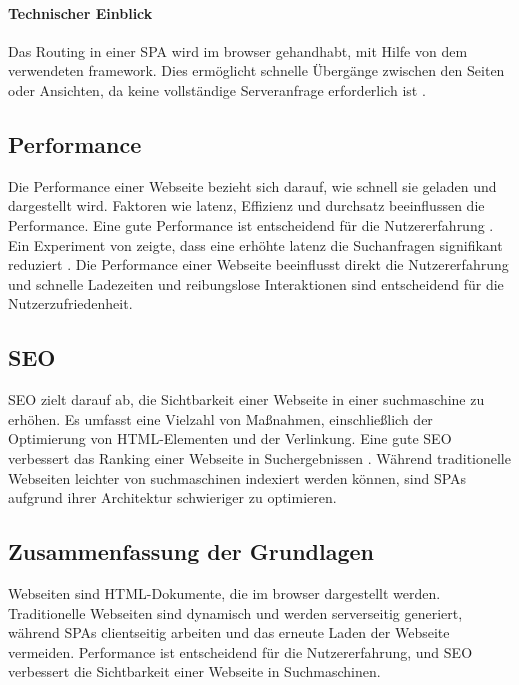 \paragraph*{Technischer Einblick}
Das Routing in einer \ac{SPA} wird im \gls{browser} gehandhabt, mit Hilfe von dem verwendeten \gls{framework}.
Dies ermöglicht schnelle Übergänge zwischen den Seiten oder Ansichten, da keine vollständige Serveranfrage erforderlich ist \cite{Scott2015}.

\subsection{Performance}
Die Performance einer Webseite bezieht sich darauf, wie schnell sie geladen und dargestellt wird.
Faktoren wie \gls{latenz}, Effizienz und \gls{durchsatz} beeinflussen die Performance.
Eine gute Performance ist entscheidend für die Nutzererfahrung \cite{Killelea2002}.
Ein Experiment von  zeigte, dass eine erhöhte \gls{latenz} die Suchanfragen signifikant reduziert \cite{Google2009}.
Die Performance einer Webseite beeinflusst direkt die Nutzererfahrung und schnelle Ladezeiten und reibungslose Interaktionen sind entscheidend für die Nutzerzufriedenheit.

\subsection{\ac{SEO}}
\ac{SEO} zielt darauf ab, die Sichtbarkeit einer Webseite in einer \gls{suchmaschine} zu erhöhen.
Es umfasst eine Vielzahl von Maßnahmen, einschließlich der Optimierung von \ac{HTML}-Elementen und der Verlinkung.
Eine gute \ac{SEO} verbessert das Ranking einer Webseite in Suchergebnissen \cite{John2016}.
Während traditionelle Webseiten leichter von \gls{suchmaschine}n indexiert werden können, sind \ac{SPA}s aufgrund ihrer Architektur schwieriger zu optimieren.

\subsection*{Zusammenfassung der Grundlagen}
Webseiten sind \ac{HTML}-Dokumente, die im \gls{browser} dargestellt werden.
Traditionelle Webseiten sind dynamisch und werden serverseitig generiert, während \ac{SPA}s clientseitig arbeiten und das erneute Laden der Webseite vermeiden.
Performance ist entscheidend für die Nutzererfahrung, und \ac{SEO} verbessert die Sichtbarkeit einer Webseite in Suchmaschinen.

